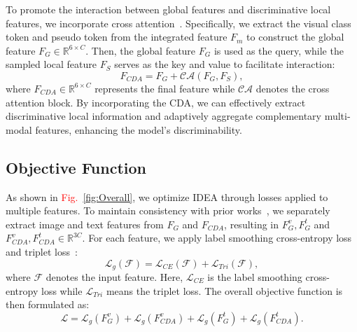 To promote the interaction between global features and discriminative local features, we incorporate cross attention~\cite{dosovitskiy2020image}.
%
Specifically, we extract the visual class token and pseudo token from the integrated feature \( F_{m} \) to construct the global feature \( F_{G} \in \mathbb{R}^{6 \times C} \).
Then, the global feature \( F_{G} \) is used as the query, while the sampled local feature \( F_{S} \) serves as the key and value to facilitate interaction:
\begin{equation}
    F_{CDA} = F_{G} + \mathcal{CA}(F_{G}, F_{S}),
\end{equation}
%
where \( F_{CDA} \in \mathbb{R}^{6 \times C} \) represents the final feature while \( \mathcal{CA} \) denotes the cross attention block.
%
By incorporating the CDA, we can effectively extract discriminative local information and adaptively aggregate complementary multi-modal features, enhancing the model’s discriminability.
%
\subsection{Objective Function}
As shown in \textcolor{red}{Fig.}~\ref{fig:Overall}, we optimize IDEA through losses applied to multiple features.
%
To maintain consistency with prior works~\cite{wang2024top,zhang2024magic}, we separately extract image and text features from \( F_{G} \) and \( F_{CDA} \), resulting in \( F^{v}_{G}, F^{t}_{G} \) and \( F^{v}_{CDA}, F^{t}_{CDA} \in \mathbb{R}^{3C} \).
%
For each feature, we apply label smoothing cross-entropy loss~\cite{szegedy2016rethinking} and triplet loss~\cite{hermans2017defense}:
\begin{equation}
    \mathcal{L}_{g}(\mathcal{F}) = \mathcal{L}_{CE}(\mathcal{F}) + \mathcal{L}_{Tri}(\mathcal{F}),
\end{equation}
where \( \mathcal{F} \) denotes the input feature.
%
Here, \( \mathcal{L}_{CE} \) is the label smoothing cross-entropy loss while \( \mathcal{L}_{Tri} \) means the triplet loss.
%
The overall objective function is then formulated as:
\begin{equation}
    \mathcal{L} = \mathcal{L}_{g}(F^{v}_{G}) + \mathcal{L}_{g}(F^{v}_{CDA}) + \mathcal{L}_{g}(F^{t}_{G}) + \mathcal{L}_{g}(F^{t}_{CDA}).
\end{equation}
\vspace{-8mm} 